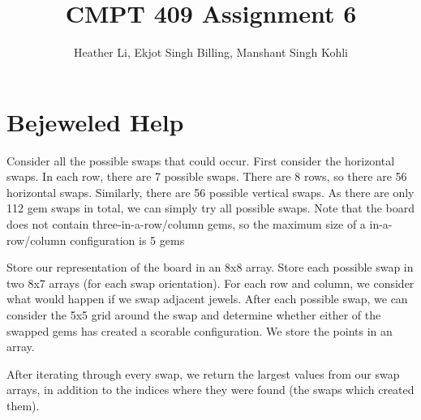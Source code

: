 \documentclass{article}
\title{CMPT 409 Assignment 6}
\author{Heather Li, Ekjot Singh Billing, Manshant Singh Kohli}
\begin{document}
\maketitle

\section{Bejeweled Help}
Consider all the possible swaps that could occur. First consider the horizontal swaps. In each row, there are 7 possible swaps. There are 8 rows, so there are 56 horizontal swaps. Similarly, there are 56 possible vertical swaps. As there are only 112 gem swaps in total, we can simply try all possible swaps. Note that the board does not contain three-in-a-row/column gems, so the maximum size of a in-a-row/column configuration is 5 gems
\par
Store our representation of the board in an 8x8 array. Store each possible swap in two 8x7 arrays (for each swap orientation).  For each row and column, we consider what would happen if we swap adjacent jewels. After each possible swap, we can consider the 5x5 grid around the swap and determine whether either of the swapped gems has created a scorable configuration. We store the points in an array.
\par 
After iterating through every swap, we return the largest values from our swap arrays, in addition to the indices where they were found (the swaps which created them).
\end{document}
